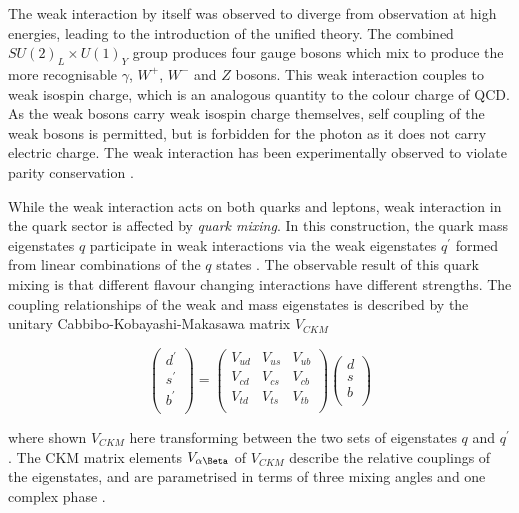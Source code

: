 		The weak interaction by itself was observed to diverge from observation at high energies, leading to the introduction of the unified theory. The combined $SU(2)_L\times U(1)_Y$ group produces four gauge bosons which mix to produce the more recognisable $\gamma$, $W^+$, $W^-$ and $Z$ bosons. This weak interaction couples to weak isospin charge, which is an analogous quantity to the colour charge of QCD. As the weak bosons carry weak isospin charge themselves, self coupling of the weak bosons is permitted, but is forbidden for the photon as it does not carry electric charge. The weak interaction has been experimentally observed to violate parity conservation \cite{parityviolation, martinshaw}.

		While the weak interaction acts on both quarks and leptons, weak interaction in the quark sector is affected by \textit{quark mixing}. In this construction, the quark mass eigenstates $q$ participate in weak interactions via the weak eigenstates $q^\prime$ formed from linear combinations of the $q$ states \cite{martinshaw}. The observable result of this quark mixing is that different flavour changing interactions have different strengths. The coupling relationships of the weak and mass eigenstates is described by the unitary Cabbibo-Kobayashi-Makasawa  matrix $V_{CKM}$ \cite{ckm-c, ckm-km}

		\begin{equation}
		\begin{pmatrix}
		d^\prime \\
		s^\prime\\
		b^\prime \\
		\end{pmatrix}
		 = \begin{pmatrix}
		V_{ud} & V_{us} & V_{ub} \\
		V_{cd} & V_{cs} & V_{cb} \\
		V_{td} & V_{ts} & V_{tb} \\
		\end{pmatrix}
	    \begin{pmatrix}
	    d \\
	    s\\
	    b \\
	    \end{pmatrix}
		\end{equation}

		where shown $V_{CKM}$ here transforming between the two sets of eigenstates $q$ and $q^\prime$. The CKM matrix elements $V_{\alpha\Beta}$ of $V_{CKM}$ describe the relative couplings of the eigenstates, and are parametrised in terms of three mixing angles and one complex phase \cite{ckm-km, ckm-param}.

